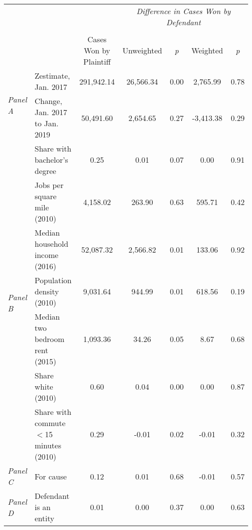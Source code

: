 \begin{tabular}{llccccc}
\toprule
 &  & \textit{} & \multicolumn{4}{c}{\textit{Difference in Cases Won by Defendant}} \\
\cline{4-7}
\\
 &  & Cases Won by Plaintiff & Unweighted & \emph{p} & Weighted & \emph{p} \\
\midrule
\multirow[c]{2}{3cm}{\textit{Panel A}} & Zestimate, Jan. 2017 & 291,942.14 & 26,566.34 & 0.00 & 2,765.99 & 0.78 \\
 & Change, Jan. 2017 to Jan. 2019 & 50,491.60 & 2,654.65 & 0.27 & -3,413.38 & 0.29 \\
\cline{1-7}
\multirow[c]{7}{3cm}{\textit{Panel B}} & Share with bachelor's degree & 0.25 & 0.01 & 0.07 & 0.00 & 0.91 \\
 & Jobs per square mile (2010) & 4,158.02 & 263.90 & 0.63 & 595.71 & 0.42 \\
 & Median household income (2016) & 52,087.32 & 2,566.82 & 0.01 & 133.06 & 0.92 \\
 & Population density (2010) & 9,031.64 & 944.99 & 0.01 & 618.56 & 0.19 \\
 & Median two bedroom rent (2015) & 1,093.36 & 34.26 & 0.05 & 8.67 & 0.68 \\
 & Share white (2010) & 0.60 & 0.04 & 0.00 & 0.00 & 0.87 \\
 & Share with commute $<$15 minutes (2010) & 0.29 & -0.01 & 0.02 & -0.01 & 0.32 \\
\cline{1-7}
\textit{Panel C} & For cause & 0.12 & 0.01 & 0.68 & -0.01 & 0.57 \\
\cline{1-7}
\textit{Panel D} & Defendant is an entity & 0.01 & 0.00 & 0.37 & 0.00 & 0.63 \\
\cline{1-7}
\bottomrule
\end{tabular}
